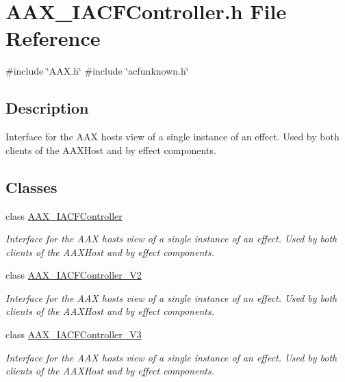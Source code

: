 \hypertarget{a00515}{}\section{A\+A\+X\+\_\+\+I\+A\+C\+F\+Controller.\+h File Reference}
\label{a00515}
{\ttfamily \#include \char`\"{}A\+A\+X.\+h\char`\"{}}\newline
{\ttfamily \#include \char`\"{}acfunknown.\+h\char`\"{}}\newline


\subsection{Description}
Interface for the A\+AX host\textquotesingle{}s view of a single instance of an effect. Used by both clients of the A\+A\+X\+Host and by effect components. 

\subsection*{Classes}
\begin{DoxyCompactItemize}
\item 
class \mbox{\hyperlink{a01637}{A\+A\+X\+\_\+\+I\+A\+C\+F\+Controller}}
\begin{DoxyCompactList}\small\item\em Interface for the A\+AX host\textquotesingle{}s view of a single instance of an effect. Used by both clients of the A\+A\+X\+Host and by effect components. \end{DoxyCompactList}\item 
class \mbox{\hyperlink{a01641}{A\+A\+X\+\_\+\+I\+A\+C\+F\+Controller\+\_\+\+V2}}
\begin{DoxyCompactList}\small\item\em Interface for the A\+AX host\textquotesingle{}s view of a single instance of an effect. Used by both clients of the A\+A\+X\+Host and by effect components. \end{DoxyCompactList}\item 
class \mbox{\hyperlink{a01645}{A\+A\+X\+\_\+\+I\+A\+C\+F\+Controller\+\_\+\+V3}}
\begin{DoxyCompactList}\small\item\em Interface for the A\+AX host\textquotesingle{}s view of a single instance of an effect. Used by both clients of the A\+A\+X\+Host and by effect components. \end{DoxyCompactList}\end{DoxyCompactItemize}
